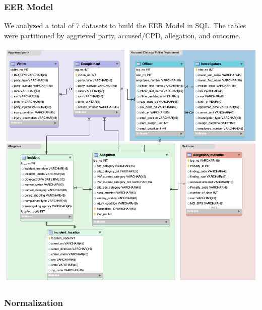 \documentclass[
]{article}
\begin{document}
\hypertarget{eer-model}{%
\subsubsection{EER Model}\label{eer-model}}

We analyzed a total of 7 datasets to build the EER Model in SQL. The
tables were partitioned by aggrieved party, accused/CPD, allegation, and
outcome.

\includegraphics{ER_Model_updated.png}

\hypertarget{normalization}{%
\subsubsection{Normalization}\label{normalization}}
\end{document}
